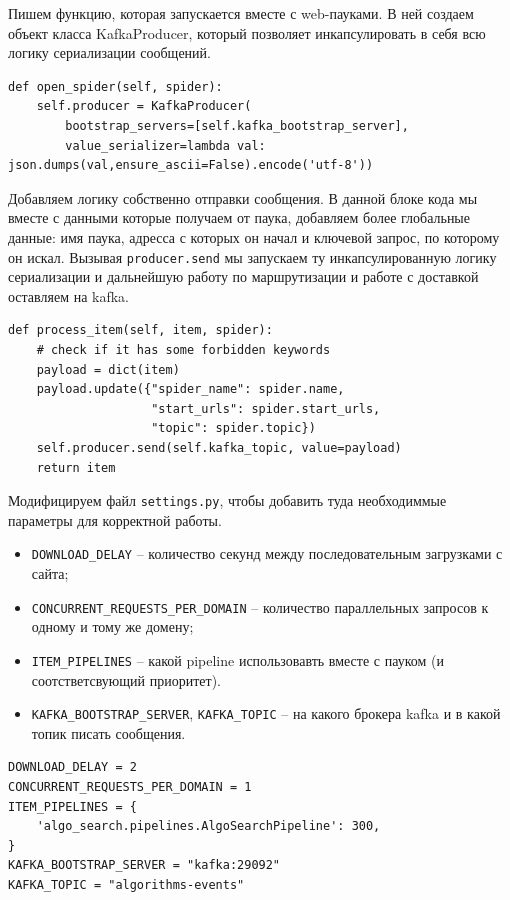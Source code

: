 Пишем функцию, которая запускается вместе с web-пауками. В ней создаем объект
класса KafkaProducer, который позволяет инкапсулировать в себя всю логику
сериализации сообщений.
\begin{verbatim}
def open_spider(self, spider):
    self.producer = KafkaProducer(
        bootstrap_servers=[self.kafka_bootstrap_server],
        value_serializer=lambda val: json.dumps(val,ensure_ascii=False).encode('utf-8'))
\end{verbatim}

Добавляем логику собственно отправки сообщения. В данной блоке кода мы вместе с
данными которые получаем от паука, добавляем более глобальные данные: имя паука,
адресса с которых он начал и ключевой запрос, по которому он искал. Вызывая
\verb|producer.send| мы запускаем ту инкапсулированную логику сериализации и
дальнейшую работу по маршрутизации и работе с доставкой оставляем на kafka.
\begin{verbatim}
def process_item(self, item, spider):
    # check if it has some forbidden keywords
    payload = dict(item)
    payload.update({"spider_name": spider.name,
                    "start_urls": spider.start_urls,
                    "topic": spider.topic})
    self.producer.send(self.kafka_topic, value=payload)
    return item
\end{verbatim}

Модифицируем файл \verb|settings.py|, чтобы добавить туда необходиммые параметры
для корректной работы.
\begin{itemize}
    \item \verb|DOWNLOAD_DELAY| -- количество секунд между последовательным загрузками с сайта;
    \item \verb|CONCURRENT_REQUESTS_PER_DOMAIN| -- количество параллельных
        запросов к одному и тому же домену;
    \item \verb|ITEM_PIPELINES| -- какой pipeline использовавть вместе с пауком
        (и соотстветсвующий приоритет).
    \item \verb|KAFKA_BOOTSTRAP_SERVER|, \verb|KAFKA_TOPIC| -- на какого брокера
        kafka и в какой топик писать сообщения.
\end{itemize}
\begin{verbatim}
DOWNLOAD_DELAY = 2
CONCURRENT_REQUESTS_PER_DOMAIN = 1
ITEM_PIPELINES = {
    'algo_search.pipelines.AlgoSearchPipeline': 300,
}
KAFKA_BOOTSTRAP_SERVER = "kafka:29092"
KAFKA_TOPIC = "algorithms-events"
\end{verbatim}

